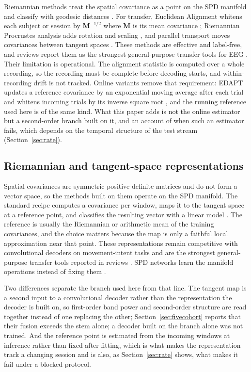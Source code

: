 \documentclass[a4paper,fleqn]{cas-dc}
\begin{document}
Riemannian methods treat the spatial covariance as a point on the SPD manifold
and classify with geodesic distances \citep{barachant,barachant2013,congedo}.
For transfer, Euclidean Alignment whitens each subject or session by
$\mathbf{M}^{-1/2}$ where $\mathbf{M}$ is its mean covariance \citep{hewu};
Riemannian Procrustes analysis adds rotation and scaling \citep{rodrigues}, and
parallel transport moves covariances between tangent spaces \citep{yair,zanini}.
These methods are effective and label-free, and reviews report them as the
strongest general-purpose transfer tools for EEG \citep{lotte2018,wu_transfer}.
Their limitation is operational. The alignment statistic
is computed over a whole recording, so the recording must be complete before
decoding starts, and within-recording drift is not tracked. Online variants remove that
requirement: EDAPT updates a reference covariance by an exponential moving
average after each trial and whitens incoming trials by its inverse square root
\citep{edapt}, and the running reference used here is of the same kind. What this
paper adds is not the online estimator but a second-order branch built on it,
and an account of when such an estimator fails, which depends on the temporal
structure of the test stream (Section~\ref{sec:rate}).

\subsection{Riemannian and tangent-space representations}
\label{sec:rw_riem}

Spatial covariances are symmetric positive-definite matrices and do not form a vector space, so the methods built on them operate on the SPD manifold. The standard recipe computes a covariance per window, maps it to the tangent space at a reference point, and classifies the resulting vector with a linear model \citep{barachant,barachant2013,congedo}. The reference is usually the Riemannian or arithmetic mean of the training covariances, and the choice matters because the map is only a faithful local approximation near that point. These representations remain competitive with convolutional decoders on movement-intent tasks and are the strongest general-purpose transfer tools reported in reviews \citep{lotte2018,wu_transfer}. SPD networks learn the manifold operations instead of fixing them \citep{spdnet}.

Two differences separate the branch used here from that line. The tangent map is a second input to a convolutional decoder rather than the representation the decoder is built on, so first-order band power and second-order structure are read together instead of one replacing the other; Section~\ref{sec:fivecohort} reports that their fusion exceeds the stem alone; a decoder built on the branch alone was not trained. And the reference point is estimated from the incoming windows at inference rather than fixed after fitting, which is what makes the representation track a changing session and is also, as Section~\ref{sec:rate} shows, what makes it fail under a blocked protocol.
\end{document}
